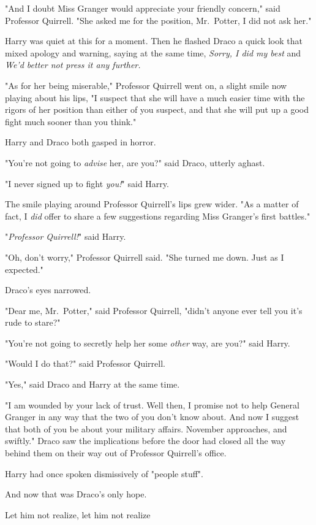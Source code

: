 "And I doubt Miss Granger would appreciate your friendly concern," said
Professor Quirrell. "She asked me for the position, Mr.~Potter, I did not ask
her."

Harry was quiet at this for a moment. Then he flashed Draco a quick look that
mixed apology and warning, saying at the same time, \emph{Sorry, I did my best}
and \emph{We'd better not press it any further.}

"As for her being miserable," Professor Quirrell went on, a slight smile now
playing about his lips, "I suspect that she will have a much easier time with
the rigors of her position than either of you suspect, and that she will put up
a good fight much sooner than you think."

Harry and Draco both gasped in horror.

"You're not going to \emph{advise} her, are you?" said Draco, utterly aghast.

"I never signed up to fight \emph{you!}" said Harry.

The smile playing around Professor Quirrell's lips grew wider. "As a matter of
fact, I \emph{did} offer to share a few suggestions regarding Miss Granger's
first battles."

"\emph{Professor Quirrell!}" said Harry.

"Oh, don't worry," Professor Quirrell said. "She turned me down. Just as I
expected."

Draco's eyes narrowed.

"Dear me, Mr.~Potter," said Professor Quirrell, "didn't anyone ever tell you
it's rude to stare?"

"You're not going to secretly help her some \emph{other} way, are you?" said
Harry.

"Would I do that?" said Professor Quirrell.

"Yes," said Draco and Harry at the same time.

"I am wounded by your lack of trust. Well then, I promise not to help General
Granger in any way that the two of you don't know about. And now I suggest that
both of you be about your military affairs. November approaches, and swiftly."
\sbreak
Draco saw the implications before the door had closed all the way behind them
on their way out of Professor Quirrell's office.

Harry had once spoken dismissively of "people stuff".

And now that was Draco's only hope.

Let him not realize, let him not realize{\el}

